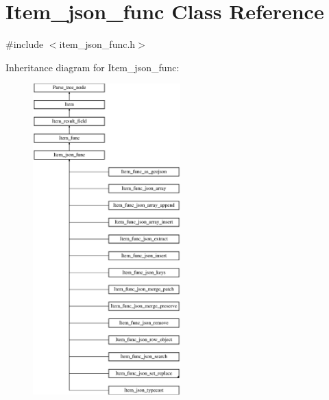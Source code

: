 \hypertarget{classItem__json__func}{}\section{Item\+\_\+json\+\_\+func Class Reference}
\label{classItem__json__func}


{\ttfamily \#include $<$item\+\_\+json\+\_\+func.\+h$>$}

Inheritance diagram for Item\+\_\+json\+\_\+func\+:\begin{figure}[H]
\begin{center}
\leavevmode
\includegraphics[height=12.000000cm]{classItem__json__func}
\end{center}
\end{figure}
